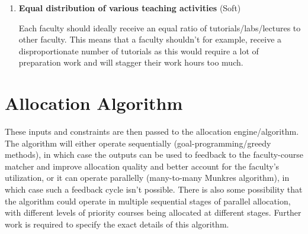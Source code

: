 \begin{enumerate}
    \item \textbf{Equal distribution of various teaching activities} (Soft)

          Each faculty should ideally receive an equal ratio of tutorials/labs/lectures to other faculty. This means that a faculty shouldn't for example, receive a disproportionate number of tutorials as this would require a lot of preparation work and will stagger their work hours too much.
\end{enumerate}
\section{Allocation Algorithm}

These inputs and constraints are then passed to the allocation engine/algorithm. The algorithm will either operate sequentially (goal-programming/greedy methods), in which case the outputs can be used to feedback to the faculty-course matcher and improve allocation quality and better account for the faculty's utilization, or it can operate parallelly (many-to-many Munkres algorithm), in which case such a feedback cycle isn't possible. There is also some possibility that the algorithm could operate in multiple sequential stages of parallel allocation, with different levels of priority courses being allocated at different stages. Further work is required to specify the exact details of this algorithm.
